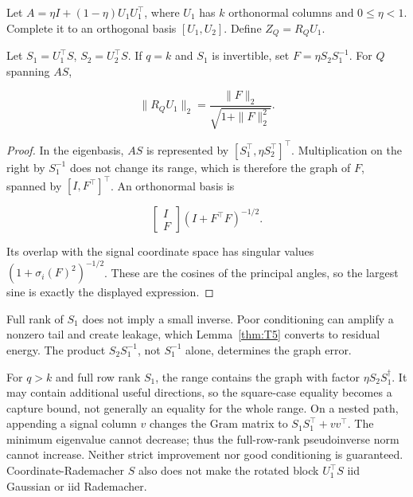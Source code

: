\begin{lemma}\label{thm:T5b}
Let $A=\eta I+(1-\eta)U_1U_1^\top$, where $U_1$ has $k$ orthonormal columns and $0\le\eta<1$. Complete it to an orthogonal basis $[U_1,U_2]$. Define $Z_Q=R_QU_1$.


Let $S_1=U_1^\top S$, $S_2=U_2^\top S$. If $q=k$ and $S_1$ is invertible, set $F=\eta S_2S_1^{-1}$. For $Q$ spanning $AS$,


\begin{equation}
\boxed{\|R_QU_1\|_2=\frac{\|F\|_2}{\sqrt{1+\|F\|_2^2}}.}
\end{equation}


\end{lemma}
\begin{proof}
In the eigenbasis, $AS$ is represented by $[S_1^\top,\eta S_2^\top]^\top$. Multiplication on the right by $S_1^{-1}$ does not change its range, which is therefore the graph of $F$, spanned by $[I,F^\top]^\top$. An orthonormal basis is


\begin{equation}
\begin{bmatrix}I\\F\end{bmatrix}(I+F^\top F)^{-1/2}.
\end{equation}


Its overlap with the signal coordinate space has singular values $(1+\sigma_i(F)^2)^{-1/2}$. These are the cosines of the principal angles, so the largest sine is exactly the displayed expression.

\end{proof}


Full rank of $S_1$ does not imply a small inverse. Poor conditioning can amplify a nonzero tail and create leakage, which Lemma~\ref{thm:T5} converts to residual energy. The product $S_2S_1^{-1}$, not $S_1^{-1}$ alone, determines the graph error.


For $q>k$ and full row rank $S_1$, the range contains the graph with factor $\eta S_2S_1^\dagger$. It may contain additional useful directions, so the square-case equality becomes a capture bound, not generally an equality for the whole range. On a nested path, appending a signal column $v$ changes the Gram matrix to $S_1S_1^\top+vv^\top$. The minimum eigenvalue cannot decrease; thus the full-row-rank pseudoinverse norm cannot increase. Neither strict improvement nor good conditioning is guaranteed. Coordinate-Rademacher $S$ also does not make the rotated block $U_1^\top S$ iid Gaussian or iid Rademacher.

